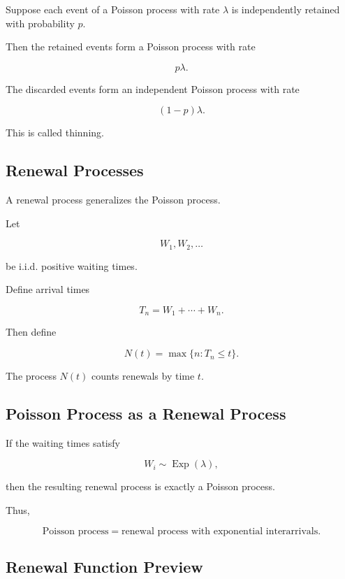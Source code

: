 Suppose each event of a Poisson process with rate \(\lambda\) is
independently retained with probability \(p\).

Then the retained events form a Poisson process with rate

\[
\boxed{
p\lambda.
}
\]

The discarded events form an independent Poisson process with rate

\[
\boxed{
(1-p)\lambda.
}
\]

This is called thinning.

\subsection{Renewal Processes}
\label{subsec:renewal-processes}

A renewal process generalizes the Poisson process.

Let

\[
W_1,W_2,\ldots
\]

be i.i.d. positive waiting times.

Define arrival times

\[
\boxed{
T_n
=
W_1+\cdots+W_n.
}
\]

Then define

\[
\boxed{
N(t)
=
\max
\{
n:T_n\leq t
\}.
}
\]

The process \(N(t)\) counts renewals by time \(t\).

\subsection{Poisson Process as a Renewal Process}
\label{subsec:poisson-renewal-special-case}

If the waiting times satisfy

\[
W_i
\sim
\operatorname{Exp}(\lambda),
\]

then the resulting renewal process is exactly a Poisson process.

Thus,

\[
\boxed{
\text{Poisson process}
=
\text{renewal process with exponential interarrivals}.
}
\]

\subsection{Renewal Function Preview}
\label{subsec:renewal-function-preview}

